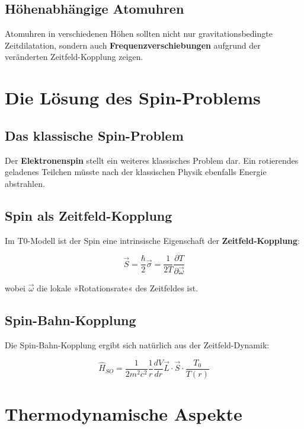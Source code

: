 \documentclass[12pt,a4paper]{report}
\begin{document}
\subsection{Höhenabhängige Atomuhren}

Atomuhren in verschiedenen Höhen sollten nicht nur gravitationsbedingte Zeitdilatation, sondern auch \textbf{Frequenzverschiebungen} aufgrund der veränderten Zeitfeld-Kopplung zeigen.

\section{Die Lösung des Spin-Problems}

\subsection{Das klassische Spin-Problem}

Der \textbf{Elektronenspin} stellt ein weiteres klassisches Problem dar. Ein rotierendes geladenes Teilchen müsste nach der klassischen Physik ebenfalls Energie abstrahlen.

\subsection{Spin als Zeitfeld-Kopplung}

Im T0-Modell ist der Spin eine intrinsische Eigenschaft der \textbf{Zeitfeld-Kopplung}:

\begin{equation}
	\vec{S} = \frac{\hbar}{2}\vec{\sigma} = \frac{1}{2T}\frac{\partial T}{\partial \vec{\omega}}
\end{equation}

wobei $\vec{\omega}$ die lokale »Rotationsrate« des Zeitfeldes ist.

\subsection{Spin-Bahn-Kopplung}

Die Spin-Bahn-Kopplung ergibt sich natürlich aus der Zeitfeld-Dynamik:

\begin{equation}
	\hat{H}_{SO} = \frac{1}{2m^2c^2}\frac{1}{r}\frac{dV}{dr}\vec{L} \cdot \vec{S} \cdot \frac{T_0}{T(r)}
\end{equation}

\section{Thermodynamische Aspekte}
\end{document}
